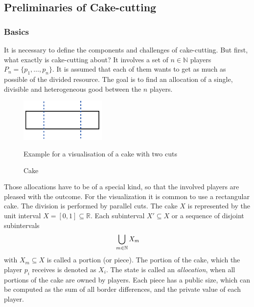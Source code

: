 \newpage
\subsection{Preliminaries of Cake-cutting}
\subsubsection{Basics}
It is necessary to define the components and challenges of cake-cutting. But first, what exactly is cake-cutting about? It involves a set of $n \in \mathbb{N}$ players $P_n=\{p_1,\ldots,p_n\}$. It is assumed that each of them wants to get as much as possible of the divided resource. The goal is to find an allocation of a single, divisible and heterogeneous good between the $n$ players.\\ 
	\begin{figure}[h]
		\centering
 		 \includegraphics[width=120pt]{kek.pdf}
   \caption{Cake}Example for a visualisation of a cake with two cuts
  	 \end{figure} 
Those allocations have to be of a special kind, so that the involved players are pleased with the outcome. For the visualization it is common to use a rectangular cake. The division is performed by parallel cuts. The cake $X$ is represented by the unit interval $X=[0,1] \subseteq \mathbb{R}$. Each subinterval $X'\subseteq X$ or a sequence of disjoint subintervals $$\sideset{}{ }\bigcup\limits_{m\in\mathbb{N}}X_m$$
with $X_m\subseteq X$ is called a portion (or piece). The portion of the cake, which the player $p_i$ receives is denoted as $X_i$. The state is called an \emph{allocation}, when all portions of the cake are owned by players. Each piece has a public size, which can be computed as the sum of all border differences, and the private value of each player.\\

